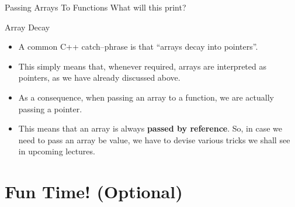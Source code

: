 \documentclass[aspectratio=169, 12pt]{beamer}
\newcommand{\ohref}[1]{\href{#1}{\texttt{#1}}}
\begin{document}
	\begin{frame}{Passing Arrays To Functions}
		What will this print?
		
		\scalebox{0.71}{%
		}
	\end{frame}

	\begin{headsup}{Array Decay}
		\begin{itemize}
			\item A common C++ catch--phrase is that ``arrays decay into pointers''.
			\item This simply means that, whenever required, arrays are interpreted as pointers, as we have already discussed above.
			\item As a consequence, when passing an array to a function, we are actually passing a pointer.
			\item This means that an array is always \textbf{passed by reference}. So, in case we need to pass an array be value, we have to devise various tricks we shall see in upcoming lectures.
		\end{itemize}
	\end{headsup}
	
%		

%	
	
%	
%	
	
	\section{Fun Time! (Optional)}\label{sec:fun-time}
	
\end{document}
